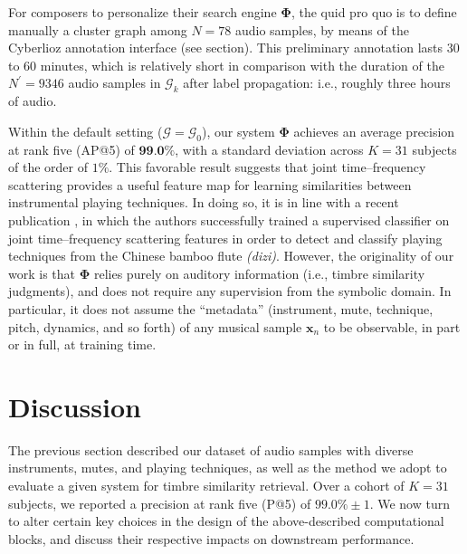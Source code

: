 \documentclass{bmcart}
\newcommand{\lnameref}[1]{%
\bgroup
\let\nmu\MakeLowercase
\nameref{#1}\egroup}
\newcommand{\nmu}{}
\begin{document}
For composers to personalize their search engine $\mathbf{\Phi}$, the quid pro quo is to define manually a cluster graph among $N=78$ audio samples, by means of the Cyberlioz annotation interface (see \lnameref{sec:data-collection} section).
This preliminary annotation lasts $30$ to $60$ minutes, which is relatively short in comparison with the duration of the $N^\prime = 9346$ audio samples in $\mathcal{G}_k$ after label propagation: i.e., roughly three hours of audio.

Within the default setting ($\mathcal{G}=\mathcal{G}_0$), our system $\mathbf{\Phi}$ achieves an average precision at rank five (AP@5) of $\textbf{99.0\%}$, with a standard deviation across $K=31$ subjects of the order of $1\%$.
This favorable result suggests that joint time--frequency scattering provides a useful feature map for learning similarities between instrumental playing techniques.
In doing so, it is in line with a recent publication \cite{wang2020icassp}, in which the authors successfully trained a supervised classifier on joint time--frequency scattering features in order to detect and classify playing techniques from the Chinese bamboo flute \emph{(dizi)}.
However, the originality of our work is that $\mathbf{\Phi}$ relies purely on auditory information (i.e., timbre similarity judgments), and does not require any supervision from the symbolic domain.
In particular, it does not assume the ``metadata'' (instrument, mute, technique, pitch, dynamics, and so forth) of any musical sample $\boldsymbol{x}_n$ to be observable, in part or in full, at training time.



\section*{\nmu Discussion}
\label{sec:discussion}

The previous section described our dataset of audio samples with diverse instruments, mutes, and playing techniques, as well as the method we adopt to evaluate a given system for timbre similarity retrieval.
Over a cohort of $K=31$ subjects, we reported a precision at rank five (P@5) of $99.0\% \pm 1$.
We now turn to alter certain key choices in the design of the above-described computational blocks, and discuss their respective impacts on downstream performance.
\end{document}
